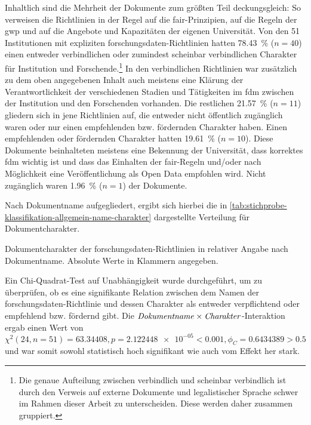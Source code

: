Inhaltlich sind die Mehrheit der Dokumente zum größten Teil deckungsgleich:
So verweisen die Richtlinien in der Regel auf die \gls{fair}-Prinzipien, auf die Regeln der \gls{gwp} und auf die Angebote und Kapazitäten der eigenen Universität.
Von den \num{51} Institutionen mit expliziten \gls{forschungsdaten}-Richtlinien hatten \SI{78,43}{\percent} ($n=\num{40}$) einen entweder verbindlichen oder zumindest scheinbar verbindlichen Charakter für Institution und Forschende.\footnote{Die genaue Aufteilung zwischen verbindlich und scheinbar verbindlich ist durch den Verweis auf externe Dokumente und legalistischer Sprache schwer im Rahmen dieser Arbeit zu unterscheiden. Diese werden daher zusammen gruppiert.}
In den verbindlichen Richtlinien war zusätzlich zu dem oben angegebenen Inhalt auch meistens eine Klärung der Verantwortlichkeit der verschiedenen Stadien und Tätigkeiten im \gls{fdm} zwischen der Institution und den Forschenden vorhanden.
Die restlichen \SI{21,57}{\percent} ($n=\num{11}$) gliedern sich in jene Richtlinien auf, die entweder nicht öffentlich zugänglich waren oder nur einen empfehlenden bzw. fördernden Charakter haben.
Einen empfehlenden oder fördernden Charakter hatten \SI{19,61}{\percent} ($n=\num{10}$).
Diese Dokumente beinhalteten meistens eine Bekennung der Universität, dass korrektes \gls{fdm} wichtig ist und dass das Einhalten der \gls{fair}-Regeln und/oder nach Möglichkeit eine Veröffentlichung als Open Data empfohlen wird.
Nicht zugänglich waren \SI{1,96}{\percent} ($n=\num{1}$) der Dokumente.

Nach Dokumentname aufgegliedert, ergibt sich hierbei die in \cref{tab:stichprobe-klassifikation-allgemein-name-charakter} dargestellte Verteilung für Dokumentcharakter.
\begin{table}[!htbp]
	\caption{Dokumentcharakter der \gls{forschungsdaten}-Richtlinien in relativer Angabe nach Dokumentname. Absolute Werte in Klammern angegeben.}
    
	\label{tab:stichprobe-klassifikation-allgemein-name-charakter}
\end{table}

Ein Chi-Quadrat-Test auf Unabhängigkeit wurde durchgeführt, um zu überprüfen, ob es eine signifikante Relation zwischen dem Namen der \gls{forschungsdaten}-Richtlinie und dessen Charakter als entweder verpflichtend oder empfehlend bzw. fördernd gibt.
Die $\text{\textit{Dokumentname}}\times\text{\textit{Charakter}}$-Interaktion ergab einen Wert von $\chi^2 (\num{24}, n=\num{51}) = \num[round-mode=places,round-precision=2]{63,34408}, p = \num[round-mode=places,round-precision=2]{2,122448e-05}<\num{0.001}, \phi_C=\num[round-mode=places,round-precision=2]{0.6434389}>\num{0.5}$ und war somit sowohl statistisch hoch signifikant wie auch vom Effekt her stark.

